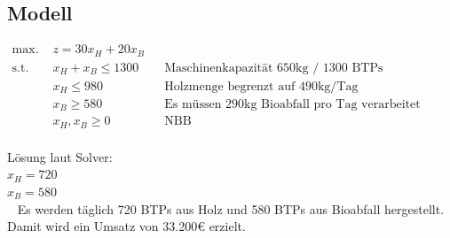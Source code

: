 \documentclass[a4paper,11pt]{article}
\begin{document}
\subsection*{Modell}
\begin{align*}
    \text{max. } & z = 30x_H + 20x_B && \\
    \text{s.t. } & x_H + x_B \le 1300 && \text{Maschinenkapazität 650kg / 1300 BTPs} \\
    & x_H \le 980 && \text{Holzmenge begrenzt auf 490kg/Tag} \\
    & x_B \ge 580 && \text{Es müssen 290kg Bioabfall pro Tag verarbeitet werden} \\
    & x_H, x_B \ge 0 && \text{NBB} \\
\end{align*}

Lösung laut Solver: \\
$x_H = 720$ \\
$x_B = 580$ \\
~\newline
Es werden täglich 720 BTPs aus Holz und 580 BTPs aus Bioabfall hergestellt. Damit wird ein Umsatz von 33.200€ erzielt.
\end{document}
